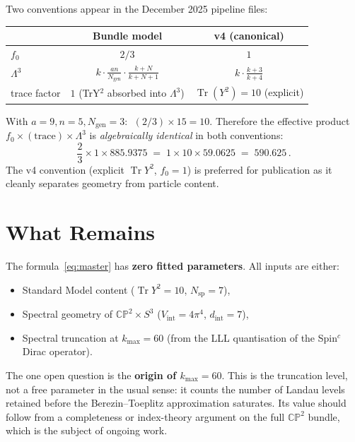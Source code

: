\documentclass[11pt]{article}
\newcommand{\Tr}{\operatorname{Tr}}
\newcommand{\CP}{\mathbb{CP}}
\begin{document}
Two conventions appear in the December 2025 pipeline files:

\medskip
\begin{tabular}{@{}lcc@{}}
\toprule
& \textbf{Bundle model} & \textbf{v4 (canonical)} \\
\midrule
$f_0$            & $2/3$   & $1$ \\
$\Lambda^3$      & $k \cdot \frac{an}{N_{\mathrm{gen}}} \cdot \frac{k+N}{k+N+1}$
                 & $k \cdot \frac{k+3}{k+4}$ \\
trace factor     & $1$ (TrY$^2$ absorbed into $\Lambda^3$)
                 & $\Tr(Y^2) = 10$ (explicit) \\
\bottomrule
\end{tabular}
\medskip

\noindent
With $a=9, n=5, N_{\mathrm{gen}}=3$: $\;(2/3) \times 15 = 10$.
Therefore the effective product $f_0 \times (\text{trace}) \times \Lambda^3$
is \emph{algebraically identical} in both conventions:
\[
\frac{2}{3} \times 1 \times 885.9375
\;=\; 1 \times 10 \times 59.0625
\;=\; 590.625\,.
\]
The v4 convention (explicit $\Tr Y^2$, $f_0=1$) is preferred for publication
as it cleanly separates geometry from particle content.


\section{What Remains}

The formula~\eqref{eq:master} has \textbf{zero fitted parameters}.
All inputs are either:
\begin{itemize}
\item Standard Model content ($\Tr Y^2 = 10$, $N_{\mathrm{sp}} = 7$),
\item Spectral geometry of $\CP^2 \times S^3$
      ($V_{\mathrm{int}} = 4\pi^4$, $d_{\mathrm{int}}=7$),
\item Spectral truncation at $k_{\max}=60$
      (from the LLL quantisation of the Spin$^c$ Dirac operator).
\end{itemize}

\noindent
The one open question is the \textbf{origin of $k_{\max}=60$}.
This is the truncation level, not a free parameter in the usual sense:
it counts the number of Landau levels retained before the Berezin--Toeplitz
approximation saturates.  Its value should follow from a completeness or
index-theory argument on the full $\CP^2$ bundle, which is the subject of
ongoing work.
\end{document}
